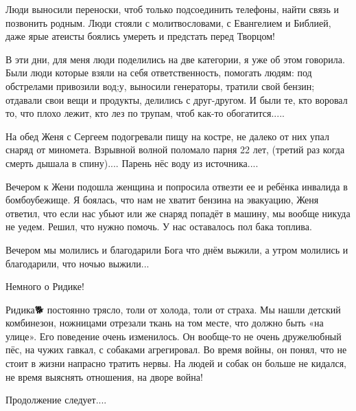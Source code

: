 Люди выносили переноски, чтоб только подсоединить телефоны, найти связь и
позвонить родным. Люди стояли с молитвословами, с Евангелием и Библией, даже
ярые атеисты боялись умереть и предстать перед Творцом! 

В эти дни, для меня люди поделились на две категории, я уже об этом говорила.
Были люди которые взяли на себя ответственность, помогать людям: под обстрелами
привозили вод;у, выносили генераторы, тратили свой бензин; отдавали свои вещи и
продукты, делились с друг-другом. И были те, кто воровал то, что плохо лежит,
кто лез по трупам, чтоб как-то обогатится.....

На обед Женя с Сергеем подогревали пищу на костре, не далеко от них упал снаряд
от миномета. Взрывной волной поломало парня 22 лет, (третий раз когда смерть
дышала в спину).... Парень нёс воду из источника....

Вечером к Жени подошла женщина и попросила отвезти ее и ребёнка инвалида в
бомбоубежище. Я боялась, что нам не хватит бензина на эвакуацию, Женя ответил,
что если нас убьют или же снаряд попадёт в машину, мы вообще никуда не уедем.
Решил, что нужно помочь. У нас оставалось пол бака топлива. 

Вечером мы молились и благодарили Бога что днём выжили, а утром молились и
благодарили, что ночью выжили...

Немного о Ридике!

Ридика🐕 постоянно трясло, толи от холода, толи от страха. Мы нашли детский
комбинезон, ножницами отрезали ткань на том месте, что должно быть «на улице».
Его поведение очень изменилось. Он вообще-то не очень дружелюбный пёс, на чужих
гавкал, с собаками агрегировал. Во время войны, он понял, что не стоит в жизни
напрасно тратить нервы. На людей и собак он больше не кидался, не время
выяснять отношения, на дворе война!

Продолжение следует....
